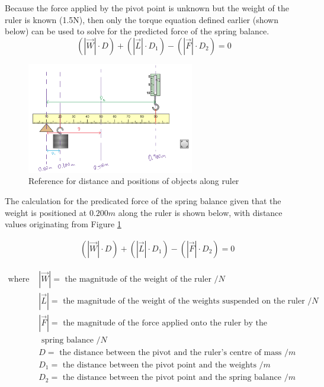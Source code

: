 \documentclass[letterpaper, 12pt]{article}
\begin{document}
Because the force applied by the pivot point is unknown but the weight of the ruler is known (1.5\unit{N}),
then only the torque equation defined earlier (shown below) can be used to solve for
the predicted force of the spring balance.
$$
    \left(\left|\vec{W}\right|\cdot D\right) + \left(\left|\vec{L}\right|\cdot D_1\right) - \left(\left|\vec{F}\right|\cdot D_2\right) = 0
$$

\begin{figure}[H]
    \centering
    \includegraphics[width=0.65\textwidth]{distanceref}
    \caption{Reference for distance and positions of objects along ruler}
    \label{fig:distRef}
\end{figure}

The calculation for the predicated force of the spring balance given that
the weight is positioned at $0.200\unit{m}$ along the ruler is shown below,
with distance values originating from Figure \ref*{fig:distRef}

\begin{align*}
     & \left(\left|\vec{W}\right|\cdot D\right) + \left(\left|\vec{L}\right|\cdot D_1\right) - \left(\left|\vec{F}\right|\cdot D_2\right) = 0
\end{align*}

\begin{align*}
    \text{where } & \left|\vec{W}\right| = \text{ the magnitude of the weight of the ruler } /\unit{N}
    \\
                  & \left|\vec{L}\right| = \text{ the magnitude of the weight of the weights suspended on the ruler } /\unit{N}
    \\
                  & \left|\vec{F}\right| = \text{ the magnitude of the force applied onto the ruler by the}
    \\ &\text{ spring balance } /\unit{N}
    \\
                  & D = \text{ the distance between the pivot and the ruler's centre of mass } /\unit{m}
    \\ & D_1 = \text{ the distance between the pivot point and the weights } /\unit{m}
    \\ & D_2 = \text{ the distance between the pivot point and the spring balance } /\unit{m}
\end{align*}
\end{document}
